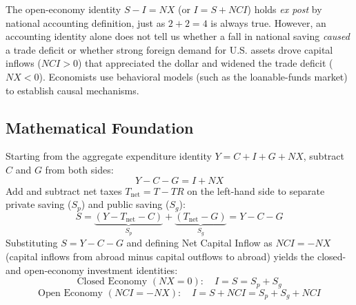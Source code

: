 \documentclass[11pt,letterpaper]{article}
\begin{document}
\begin{coreprinciple}
The open-economy identity $S - I = NX$ (or $I = S + NCI$) holds \emph{ex post} by national accounting definition, just as $2 + 2 = 4$ is always true. However, an accounting identity alone does not tell us whether a fall in national saving \emph{caused} a trade deficit or whether strong foreign demand for U.S. assets drove capital inflows ($NCI > 0$) that appreciated the dollar and widened the trade deficit ($NX < 0$). Economists use behavioral models (such as the loanable-funds market) to establish causal mechanisms.
\end{coreprinciple}

\subsection*{Mathematical Foundation}
Starting from the aggregate expenditure identity $Y = C + I + G + NX$, subtract $C$ and $G$ from both sides:
\begin{equation}
Y - C - G = I + NX
\end{equation}
Add and subtract net taxes $T_{\text{net}} = T - TR$ on the left-hand side to separate private saving ($S_p$) and public saving ($S_g$):
\begin{equation}
S = \underbrace{(Y - T_{\text{net}} - C)}_{S_p} + \underbrace{(T_{\text{net}} - G)}_{S_g} = Y - C - G
\end{equation}
Substituting $S = Y - C - G$ and defining Net Capital Inflow as $NCI = -NX$ (capital inflows from abroad minus capital outflows to abroad) yields the closed- and open-economy investment identities:
\begin{equation}
\text{Closed Economy } (NX = 0): \quad I = S = S_p + S_g
\end{equation}
\begin{equation}
\text{Open Economy } (NCI = -NX): \quad I = S + NCI = S_p + S_g + NCI
\end{equation}
\end{document}
